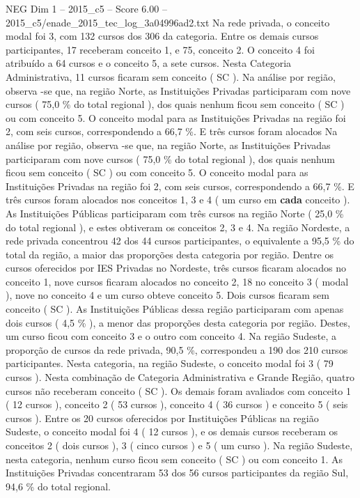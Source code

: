 \begin{textsample}{NEG Dim 1 – 2015\_c5 – Score 6.00 – 2015\_c5/enade\_2015\_tec\_log\_3a04996ad2.txt}
Na rede privada, o conceito modal foi 3, com 132 cursos dos 306 da categoria.
Entre os demais cursos participantes, 17 receberam conceito 1, e 75, conceito 2.
O conceito 4 foi atribuído a 64 cursos e o conceito 5, a sete cursos.
Nesta Categoria Administrativa, 11 cursos ficaram sem conceito ( SC ).
Na análise por região, observa -se que, na região Norte, as Instituições Privadas participaram com nove cursos ( 75,0 \% do total regional ), dos quais nenhum ficou sem conceito ( SC ) ou com conceito 5.
O conceito modal para as Instituições Privadas na região foi 2, com seis cursos, correspondendo a 66,7 \%.
E três cursos foram alocados Na análise por região, observa -se que, na região Norte, as Instituições Privadas participaram com nove cursos ( 75,0 \% do total regional ), dos quais nenhum ficou sem conceito ( SC ) ou com conceito 5.
O conceito modal para as Instituições Privadas na região foi 2, com seis cursos, correspondendo a 66,7 \%.
E três cursos foram alocados nos conceitos 1, 3 e 4 ( um curso em \textbf{cada} conceito ).
As Instituições Públicas participaram com três cursos na região Norte ( 25,0 \% do total regional ), e estes obtiveram os conceitos 2, 3 e 4.
Na região Nordeste, a rede privada concentrou 42 dos 44 cursos participantes, o equivalente a 95,5 \% do total da região, a maior das proporções desta categoria por região.
Dentre os cursos oferecidos por IES Privadas no Nordeste, três cursos ficaram alocados no conceito 1, nove cursos ficaram alocados no conceito 2, 18 no conceito 3 ( modal ), nove no conceito 4 e um curso obteve conceito 5.
Dois cursos ficaram sem conceito ( SC ).
As Instituições Públicas dessa região participaram com apenas dois cursos ( 4,5 \% ), a menor das proporções desta categoria por região.
Destes, um curso ficou com conceito 3 e o outro com conceito 4.
Na região Sudeste, a proporção de cursos da rede privada, 90,5 \%, correspondeu a 190 dos 210 cursos participantes.
Nesta categoria, na região Sudeste, o conceito modal foi 3 ( 79 cursos ).
Nesta combinação de Categoria Administrativa e Grande Região, quatro cursos não receberam conceito ( SC ).
Os demais foram avaliados com conceito 1 ( 12 cursos ), conceito 2 ( 53 cursos ), conceito 4 ( 36 cursos ) e conceito 5 ( seis cursos ).
Entre os 20 cursos oferecidos por Instituições Públicas na região Sudeste, o conceito modal foi 4 ( 12 cursos ), e os demais cursos receberam os conceitos 2 ( dois cursos ), 3 ( cinco cursos ) e 5 ( um curso ).
Na região Sudeste, nesta categoria, nenhum curso ficou sem conceito ( SC ) ou com conceito 1.
As Instituições Privadas concentraram 53 dos 56 cursos participantes da região Sul, 94,6 \% do total regional.

\end{textsample}
